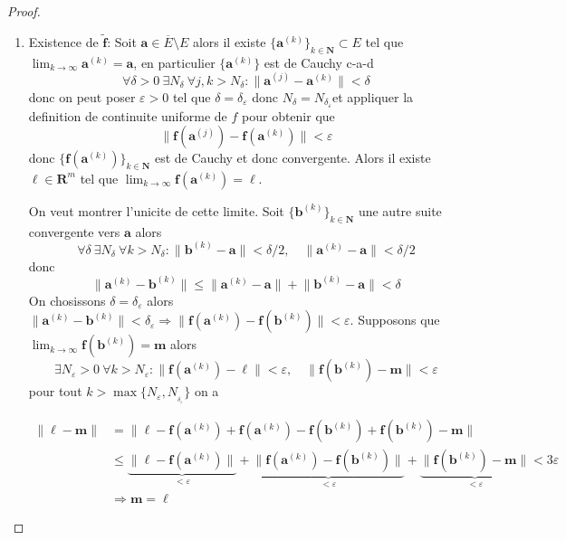 \begin{proof}
\begin{enumerate}
\item Existence de $\boldsymbol{\tilde{f}}$: Soit $\boldsymbol{a}\in \overline{E}\setminus E$ alors il existe $\{ \boldsymbol{a}^{(k)} \}_{k\in \mathbf{N}}\subset E$ tel que $\lim_{ k \to \infty }\boldsymbol{a}^{(k)}=\boldsymbol{a}$, en particulier $\{ \boldsymbol{a}^{(k)} \}$ est de Cauchy c-a-d
$$
\forall\delta>0~\exists N_{\delta}~\forall j,k>N_{\delta}:\lVert \boldsymbol{a}^{(j)}-\boldsymbol{a}^{(k)} \rVert <\delta
$$
donc on peut poser $\varepsilon>0$ tel que $\delta=\delta _{\varepsilon}$ donc $N_{\delta}=N_{\delta _{\varepsilon}}$et appliquer la definition de continuite uniforme de $f$ pour obtenir que
$$
\lVert \boldsymbol{f}(\boldsymbol{a}^{(j)})-\boldsymbol{f}(\boldsymbol{a}^{(k)}) \rVert <\varepsilon
$$
donc $\{ \boldsymbol{f}(\boldsymbol{a}^{(k)}) \}_{k\in \mathbf{N}}$ est de Cauchy et donc convergente. Alors il existe $\boldsymbol{\ell}\in \mathbf{R}^{m}$ tel que $\lim_{ k \to \infty }\boldsymbol{f}(\boldsymbol{a}^{(k)})=\boldsymbol{\ell}$.

On veut montrer l'unicite de cette limite. Soit $\{ \boldsymbol{b}^{(k)} \}_{k\in \mathbf{N}}$ une autre suite convergente vers $\boldsymbol{a}$ alors
$$
\forall\delta~\exists N_{\delta}~\forall k>N_{\delta}:\lVert \boldsymbol{b}^{(k)}-\boldsymbol{a} \rVert <\delta /2,\quad \lVert \boldsymbol{a}^{(k)}-\boldsymbol{a} \rVert<\delta /2
$$
donc
$$
\lVert \boldsymbol{a}^{(k)}-\boldsymbol{b}^{(k)} \rVert\le \lVert \boldsymbol{a}^{(k)}-\boldsymbol{a} \rVert +\lVert \boldsymbol{b}^{(k)}-\boldsymbol{a} \rVert <\delta
$$
On chosissons $\delta=\delta _{\varepsilon}$ alors $\lVert \boldsymbol{a}^{(k)}-\boldsymbol{b}^{(k)} \rVert<\delta _{\varepsilon}\Rightarrow \lVert \boldsymbol{f}(\boldsymbol{a}^{(k)})-\boldsymbol{f}(\boldsymbol{b}^{(k)}) \rVert<\varepsilon$. Supposons que $\lim_{ k \to \infty } \boldsymbol{f}(\boldsymbol{b}^{(k)})=\boldsymbol{m}$ alors
$$
\exists N_{\varepsilon}>0~\forall k>N_{\varepsilon}:\lVert \boldsymbol{f}(\boldsymbol{a}^{(k)})-\boldsymbol{\ell} \rVert <\varepsilon, \quad \lVert \boldsymbol{f}(\boldsymbol{b}^{(k)})-\boldsymbol{m} \rVert <\varepsilon
$$
pour tout $k>\max\{ N_{\varepsilon},N_{_{\delta _{\varepsilon}}} \}$ on a 

\begin{align*}
\lVert\boldsymbol{\ell}-\boldsymbol{m} \rVert  & =\lVert \boldsymbol{\ell}-\boldsymbol{f}(\boldsymbol{a}^{(k)})+\boldsymbol{f}(\boldsymbol{a}^{(k)})-\boldsymbol{f}(\boldsymbol{b}^{(k)})+\boldsymbol{f}(\boldsymbol{b}^{(k)})-\boldsymbol{m} \rVert  \\
 & \le \underbrace{ \lVert \boldsymbol{\ell}-\boldsymbol{f}(\boldsymbol{a}^{(k)}) \rVert }_{ <\varepsilon } +\underbrace{ \lVert \boldsymbol{f}(\boldsymbol{a}^{(k)})-\boldsymbol{f}(\boldsymbol{b}^{(k)}) \rVert }_{ <\varepsilon } +\underbrace{ \lVert \boldsymbol{f}(\boldsymbol{b}^{(k)})-\boldsymbol{m} \rVert }_{ <\varepsilon } <3\varepsilon \\
 & \Rightarrow \boldsymbol{m}=\boldsymbol{\ell}
\end{align*}


\end{enumerate}
\end{proof}

